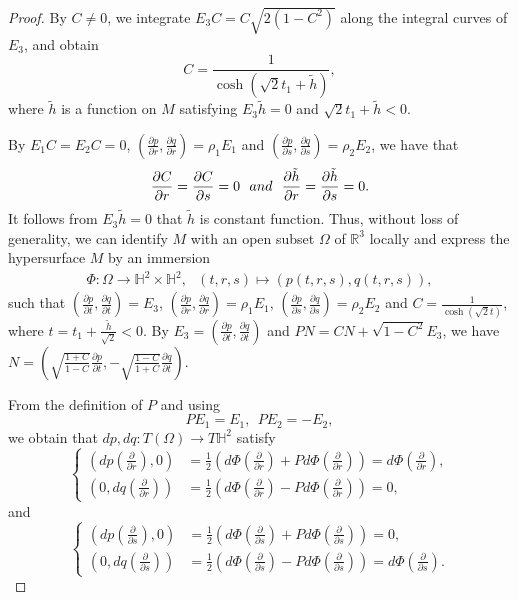 \documentclass[10pt,a4paper]{amsart}
\begin{document}
\begin{proof}
By $C\neq0$, we integrate $E_3C=C\sqrt{2(1-C^2)}$ along the integral curves of $E_3$, and obtain
$$
C=\frac{1}{\cosh(\sqrt{2}t_1+\tilde{h})},
$$
where $\tilde{h}$ is a function on $M$ satisfying $E_3\tilde{h}=0$ and
$\sqrt{2}t_1+\tilde{h}<0$.


By $E_1C=E_2C=0$, $(\frac{\partial p}{\partial r},\frac{\partial q}{\partial r})=\rho_1E_1$ and
$(\frac{\partial p}{\partial s},\frac{\partial q}{\partial s})=\rho_2E_2$, we have that
$$
\frac{\partial C}{\partial r}=\frac{\partial C}{\partial s}=0\ \  {\rm and}\ \
\frac{\partial \tilde{h}}{\partial r}=\frac{\partial \tilde{h}}{\partial s}=0.
$$
It follows from $E_3\tilde{h}=0$ that $\tilde{h}$ is constant function. Thus, without loss of generality,
we can identify $M$ with an open subset $\Omega$ of $\mathbb{R}^3$ locally and express the hypersurface $M$ by an immersion
$$
\begin{aligned}
\Phi:\Omega
\longrightarrow\mathbb{H}^2\times\mathbb{H}^2,\ \ \
(t,r,s)\mapsto (p(t,r,s),q(t,r,s)),
\end{aligned}
$$
such that $(\frac{\partial p}{\partial t},\frac{\partial q}{\partial t})=E_3$,
$(\frac{\partial p}{\partial r},\frac{\partial q}{\partial r})=\rho_1E_1$,
$(\frac{\partial p}{\partial s},\frac{\partial q}{\partial s})=\rho_2E_2$ and
$C=\frac{1}{\cosh(\sqrt{2}t)}$, where $t=t_1+\frac{\tilde{h}}{\sqrt{2}}<0$. By $E_3=(\frac{\partial p}{\partial t},\frac{\partial q}{\partial t})$ and
$PN=CN+\sqrt{1-C^2}E_3$, we have $N=(\sqrt{\frac{1+C}{1-C}}\frac{\partial p}{\partial t},-\sqrt{\frac{1-C}{1+C}}\frac{\partial q}{\partial t})$.

From the definition of $P$  and using
$$
PE_1=E_1,\ \ PE_2=-E_2,
$$
we obtain that $dp,dq:T(\Omega)\rightarrow
T\mathbb{H}^2$ satisfy
\begin{equation}\label{eqn:5.49}
\left\{
\begin{aligned}
(dp(\tfrac{\partial}{\partial r}),0)&=\tfrac{1}{2}(d\Phi(\tfrac{\partial}{\partial r})+Pd\Phi(\tfrac{\partial}{\partial r}))=d\Phi(\tfrac{\partial}{\partial r}),\\
(0,dq(\tfrac{\partial}{\partial r}))&=\tfrac{1}{2}(d\Phi(\tfrac{\partial}{\partial r})-Pd\Phi(\tfrac{\partial}{\partial r}))=0,
\end{aligned}
\right.
\end{equation}
%
%
and
\begin{equation}\label{eqn:5.50}
\left\{
\begin{aligned}
(dp(\tfrac{\partial}{\partial s}),0)&=\tfrac{1}{2}(d\Phi(\tfrac{\partial}{\partial s})+Pd\Phi(\tfrac{\partial}{\partial s}))=0,\\
(0,dq(\tfrac{\partial}{\partial s}))&=\tfrac{1}{2}(d\Phi(\tfrac{\partial}{\partial s})-Pd\Phi(\tfrac{\partial}{\partial s}))=d\Phi(\tfrac{\partial}{\partial s}).
\end{aligned}
\right.
\end{equation}


\end{proof}
\end{document}
